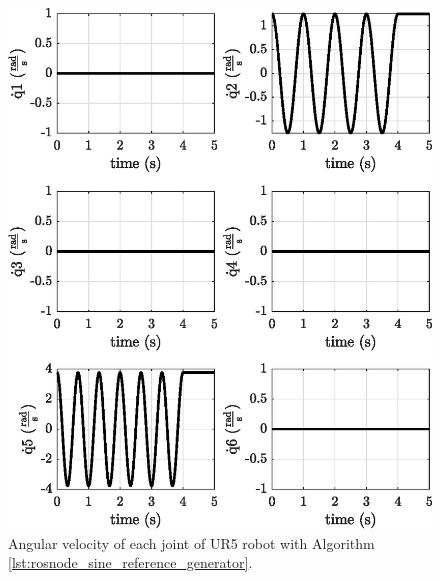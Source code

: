 \begin{figure}
    \centering
    \includegraphics{images/act_1.1/joint_velocity.eps}
    \caption{Angular velocity of each joint of UR5 robot with Algorithm \ref{lst:rosnode_sine_reference_generator}.}
    \label{fig:act_1.1_joint_velocity}
\end{figure}

